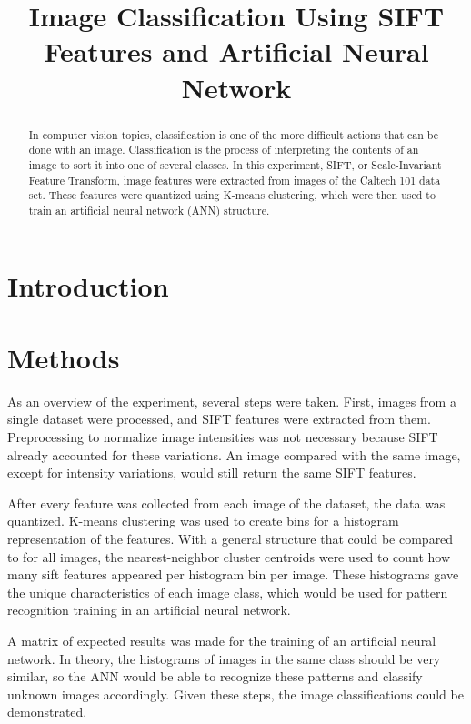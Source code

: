 \documentclass{article}
\title{Image Classification Using SIFT Features and Artificial Neural Network}
\begin{document}
%
\maketitle
%
\begin{abstract}
In computer vision topics, classification is one of the more difficult actions that can be done with an image. Classification is the process of interpreting the contents of an image to sort it into one of several classes. In this experiment, SIFT, or Scale-Invariant Feature Transform, image features were extracted from images of the Caltech 101 data set. These features were quantized using K-means clustering, which were then used to train an artificial neural network (ANN) structure. 
\end{abstract}
%
\section{Introduction}
\label{sec:intro}
%
\section{Methods}
\label{sec:methods}
As an overview of the experiment, several steps were taken. First, images from a single dataset were processed, and SIFT features were extracted from them. Preprocessing to normalize image intensities was not necessary because SIFT already accounted for these variations. An image compared with the same image, except for intensity variations, would still return the same SIFT features.

After every feature was collected from each image of the dataset, the data was quantized. K-means clustering was used to create bins for a histogram representation of the features. With a general structure that could be compared to for all images, the nearest-neighbor cluster centroids were used to count how many sift features appeared per histogram bin per image. These histograms gave the unique characteristics of each image class, which would be used for pattern recognition training in an artificial neural network.

A matrix of expected results was made for the training of an artificial neural network. In theory, the histograms of images in the same class should be very similar, so the ANN would be able to recognize these patterns and classify unknown images accordingly. Given these steps, the image classifications could be demonstrated.
%
\end{document}
